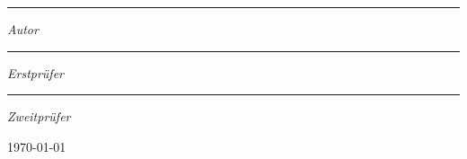 \begin{titlepage}
    \centering
    {\scshape\LARGE \uni{} \par \studiengang{} \par \modul{} \par}
    \vspace{1cm}
    {\scshape\Large \titel{} \par}
    \vspace{1.5cm}
    {\bfseries \huge \subtitel{} \par}
    \vspace{2cm}
    {\Large \vorname{} \nachname{} \par \matr{} \par}
    \vfill
    \begin{center}
        \itclogo{}
        \par
        \abteilung{}
    \end{center}

    \par\vfill
    \parbox{4cm}{\hrule \strut{} \centering \footnotesize \vorname{} \nachname{} \par \textit{Autor}}
    \hfill
    \parbox{5cm}{\hrule \strut{} \centering \footnotesize \erstpruefer{} \par \textit{Erstprüfer}}
    \hfill
    \parbox{4cm}{\hrule \strut{} \centering \footnotesize \zweitpruefer{} \par \textit{Zweitprüfer}}
    \vfill
    {\large \location{} \today \par}
\end{titlepage}